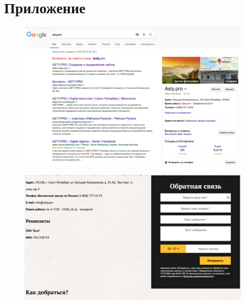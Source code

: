 \chapter{Приложение}

\begin{figure}[ht]
	\centering
	\label{asty}
	\includegraphics[width=\textwidth]{images/1.png}
	\caption{}
\end{figure}

\begin{figure}[ht]
	\centering
	\label{contacts}
	\includegraphics[width=\textwidth]{images/2.png}
	\caption{}
\end{figure}

